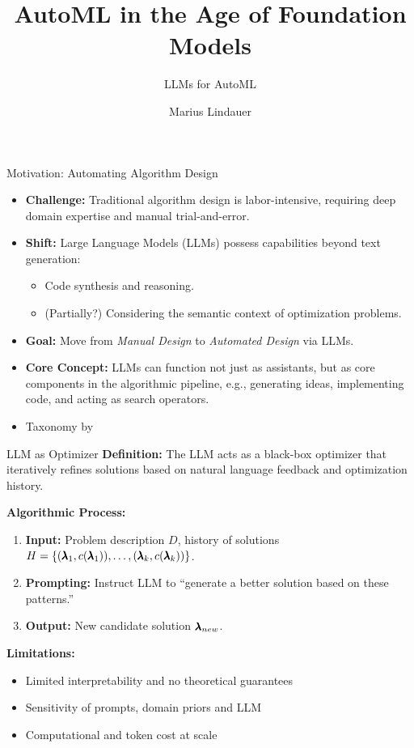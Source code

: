 \documentclass[main]{subfiles}
\title[AutoML in the Age of Foundation Models]{AutoML in the Age of Foundation Models}
\subtitle{LLMs for AutoML}
\author[Marius Lindauer]{Marius Lindauer}
\date{}
\begin{document}
	
	\maketitle
	

\begin{frame}{Motivation: Automating Algorithm Design}
    \begin{itemize}
        \item \textbf{Challenge:} Traditional algorithm design is labor-intensive, requiring deep domain expertise and manual trial-and-error.
        \item \textbf{Shift:} Large Language Models (LLMs) possess capabilities beyond text generation:
        \begin{itemize}
            \item Code synthesis and reasoning.
            \item (Partially?) Considering the semantic context of optimization problems.
        \end{itemize}
        \item \textbf{Goal:} Move from \textit{Manual Design} to \textit{Automated Design} via LLMs.
        \item \textbf{Core Concept:} LLMs can function not just as assistants, but as core components in the algorithmic pipeline, e.g., generating ideas, implementing code, and acting as search operators.
        \item[$\leadsto$] Taxonomy by 
    \end{itemize}
\end{frame}

\begin{frame}{LLM as Optimizer}
    \textbf{Definition:} The LLM acts as a black-box optimizer that iteratively refines solutions based on natural language feedback and optimization history.
    
    \vspace{0.5em}
    \textbf{Algorithmic Process:}
    \begin{enumerate}
        \item \textbf{Input:} Problem description $D$, history of solutions $H = \{(\pmb{\lambda}_1, c(\pmb{\lambda}_1)), \dots, (\pmb{\lambda}_k, c(\pmb{\lambda}_k))\}$.
        \item \textbf{Prompting:} Instruct LLM to ``generate a better solution based on these patterns.''
        \item \textbf{Output:} New candidate solution $\pmb{\lambda}_{new}$.
    \end{enumerate}

    \textbf{Limitations:}
    \begin{itemize}
        \item Limited interpretability and no theoretical guarantees
        \item Sensitivity of prompts, domain priors and LLM
        \item Computational and token cost at scale
    \end{itemize}
\end{frame}
\end{document}
